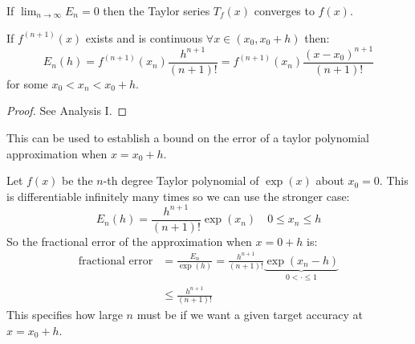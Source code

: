 \documentclass[../main.tex]{subfiles}
\begin{document}
If $\lim_{n \to \infty} E_n = 0$ then the Taylor series $T_f(x)$ converges to $f(x)$.

\begin{theorem}
If $f^{(n+1)}(x)$ exists and is continuous $\forall x \in (x_0, x_0 + h)$ then:
\[
  E_n(h) = f^{(n+1)}(x_n) \frac{h^{n+1}}{(n+1)!} = f^{(n + 1)}(x_n)\frac{(x - x_0)^{n + 1}}{(n + 1)!}
\]
for some $x_0 < x_n < x_0 + h$.
\end{theorem}
\begin{proof}
  See Analysis I.
\end{proof}

This can be used to establish a bound on the error of a taylor polynomial approximation when $x = x_0 + h$.
\begin{example}
  Let $f(x)$ be the $n$-th degree Taylor polynomial of $\exp(x)$ about $x_0 = 0$.
  This is differentiable infinitely many times so we can use the stronger case:
  \[
    E_n(h) = \frac{h^{n + 1}}{(n + 1)!}\exp(x_n)\quad 0 \leq x_n \leq h
  \]
  So the fractional error of the approximation when $x = 0 + h$ is:
  \begin{align*}
    \text{fractional error} &= \frac{E_n}{\exp(h)} = \frac{h^{n+1}}{(n+1)!}\underbrace{\exp(x_n - h)}_{0 < \cdot \leq 1} \\
                            &\leq \frac{h^{n + 1}}{(n + 1)!}
  \end{align*}
  This specifies how large $n$ must be if we want a given target accuracy at $x = x_0 + h$.
\end{example}
\end{document}
